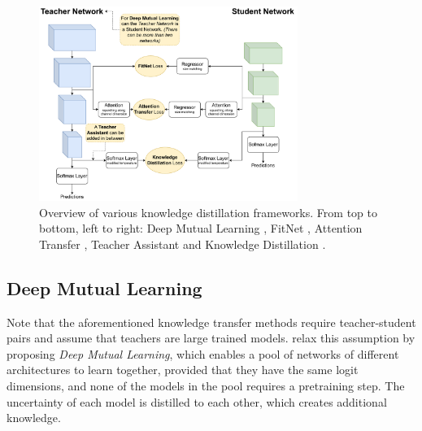\begin{figure}[htbp]
  \centering
  \includegraphics[width=0.75\textwidth]{chapter_sota/assets/kd_frameworks.pdf}
  \caption{Overview of various knowledge distillation frameworks. From top to
    bottom, left to right: Deep Mutual Learning
    \cite{DBLP:conf/cvpr/ZhangXHL18}, FitNet
    \cite{DBLP:journals/corr/RomeroBKCGB14}, Attention Transfer
    \cite{DBLP:conf/iclr/ZagoruykoK17}, Teacher Assistant
    \cite{DBLP:conf/aaai/MirzadehFLLMG20} and Knowledge Distillation
    \cite{DBLP:journals/corr/HintonVD15}.}
  \label{fig:sota:kd_frameworks}
\end{figure}

\subsection{Deep Mutual Learning}

Note that the aforementioned knowledge transfer methods require teacher-student
pairs and assume that teachers are large trained models.
\cite{DBLP:conf/cvpr/ZhangXHL18} relax this assumption by proposing \emph{Deep
  Mutual Learning}, which enables a pool of networks of different architectures to
learn together, provided that they have the same logit dimensions, and none of
the models in the pool requires a pretraining step. The uncertainty of each
model is distilled to each other, which creates additional knowledge.\\

